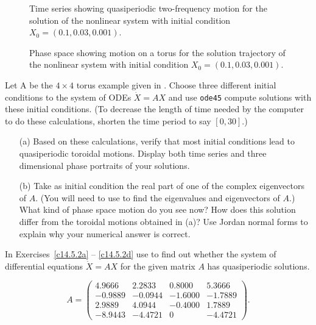 \documentclass{ximera}
\begin{document}
\begin{figure}[htb]
   \centerline{%
   }
   \caption{Time series showing quasiperiodic two-frequency motion for the 
	solution of the nonlinear system \protect{} with initial 
	condition $X_0=(0.1,0.03,0.001)$.}
   \label{F:tor3ts}
\end{figure}

\begin{figure}[htb]
   \centerline{%
   }
   \caption{Phase space showing motion on a torus for the solution trajectory 
	of the nonlinear system \protect{} with initial condition 
	$X_0=(0.1,0.03,0.001)$.}
   \label{F:tor3ps}
\end{figure}


\EXER

\CEXER

\begin{exercise}  \label{EX:tor4}
Let A be the $4\times 4$ torus example given in .  Choose three 
different initial conditions to the system of ODEs $\dot{X}=AX$ and use 
{\tt ode45} compute solutions with these initial conditions.  (To decrease 
the length of time needed by the computer to do these calculations, shorten 
the time period to say $[0,30]$.)  
\begin{itemize}
\item[(a)]  Based on these calculations, verify that most initial conditions 
lead to quasiperiodic toroidal motions.  Display both time series and 
three dimensional phase portraits of your solutions. 
\item[(b)]  Take as initial condition the real part of one of the complex
eigenvectors of $A$.  (You will need to use \Matlab to find the eigenvalues
and eigenvectors of $A$.)  What kind of phase space motion do you see now? 
How does this solution differ from the toroidal motions obtained in (a)? 
Use Jordan normal forms to explain why your numerical answer is correct.
\end{itemize}
\end{exercise} 

\noindent In Exercises~\ref{c14.5.2a} -- \ref{c14.5.2d} use \Matlab to find
out whether the system of differential equations $\dot X= AX$ for
the given matrix $A$ has quasiperiodic solutions.
\begin{exercise} \label{c14.5.2a}
\begin{equation*}
A=\left(\begin{array}{rrrr}
    4.9666  &  2.2833  &  0.8000  &  5.3666\\
   -0.9889  & -0.0944  & -1.6000  & -1.7889\\
    2.9889  &  4.0944  & -0.4000  &  1.7889\\
   -8.9443  & -4.4721  &       0  & -4.4721
\end{array}\right).
\end{equation*}
\end{exercise}
\end{document}
